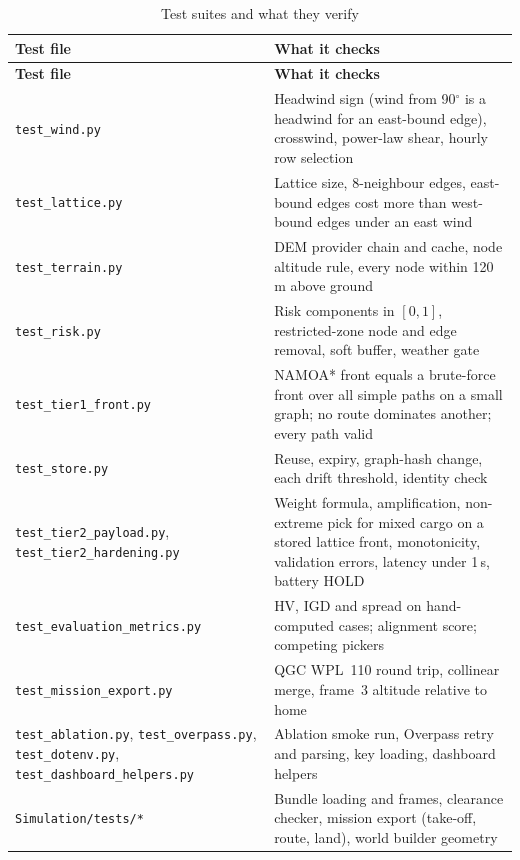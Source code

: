 \begin{small}
\begin{longtable}{|P{5.6cm}|P{8.6cm}|}
\caption{Test suites and what they verify}\label{tab:tests}\\
\hline
\textbf{Test file} & \textbf{What it checks}\\
\hline
\endfirsthead
\hline
\textbf{Test file} & \textbf{What it checks}\\
\hline
\endhead
\texttt{test\_wind.py} & Headwind sign (wind from 90$^\circ$ is a headwind for an east-bound edge), crosswind, power-law shear, hourly row selection\\
\hline
\texttt{test\_lattice.py} & Lattice size, 8-neighbour edges, east-bound edges cost more than west-bound edges under an east wind\\
\hline
\texttt{test\_terrain.py} & DEM provider chain and cache, node altitude rule, every node within 120\,m above ground\\
\hline
\texttt{test\_risk.py} & Risk components in $[0,1]$, restricted-zone node and edge removal, soft buffer, weather gate\\
\hline
\texttt{test\_tier1\_front.py} & NAMOA* front equals a brute-force front over all simple paths on a small graph; no route dominates another; every path valid\\
\hline
\texttt{test\_store.py} & Reuse, expiry, graph-hash change, each drift threshold, identity check\\
\hline
\texttt{test\_tier2\_payload.py}, \texttt{test\_tier2\_hardening.py} & Weight formula, amplification, non-extreme pick for mixed cargo on a stored lattice front, monotonicity, validation errors, latency under 1\,s, battery HOLD\\
\hline
\texttt{test\_evaluation\_metrics.py} & HV, IGD and spread on hand-computed cases; alignment score; competing pickers\\
\hline
\texttt{test\_mission\_export.py} & QGC WPL~110 round trip, collinear merge, frame~3 altitude relative to home\\
\hline
\texttt{test\_ablation.py}, \texttt{test\_overpass.py}, \texttt{test\_dotenv.py}, \texttt{test\_dashboard\_helpers.py} & Ablation smoke run, Overpass retry and parsing, key loading, dashboard helpers\\
\hline
\texttt{Simulation/tests/*} & Bundle loading and frames, clearance checker, mission export (take-off, route, land), world builder geometry\\
\hline
\end{longtable}
\end{small}


